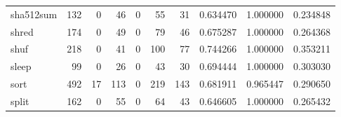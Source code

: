 \begin{longtable}{lrrrrrrrrr}
sha512sum &                                                132 &                                                  0 &                                                 46 &                                                  0 &                                                 55 &                                                 31 &                                           0.634470 &                               1.000000 &                             0.234848 \\
shred     &                                                174 &                                                  0 &                                                 49 &                                                  0 &                                                 79 &                                                 46 &                                           0.675287 &                               1.000000 &                             0.264368 \\
shuf      &                                                218 &                                                  0 &                                                 41 &                                                  0 &                                                100 &                                                 77 &                                           0.744266 &                               1.000000 &                             0.353211 \\
sleep     &                                                 99 &                                                  0 &                                                 26 &                                                  0 &                                                 43 &                                                 30 &                                           0.694444 &                               1.000000 &                             0.303030 \\
sort      &                                                492 &                                                 17 &                                                113 &                                                  0 &                                                219 &                                                143 &                                           0.681911 &                               0.965447 &                             0.290650 \\
split     &                                                162 &                                                  0 &                                                 55 &                                                  0 &                                                 64 &                                                 43 &                                           0.646605 &                               1.000000 &                             0.265432 \\

\end{longtable}
